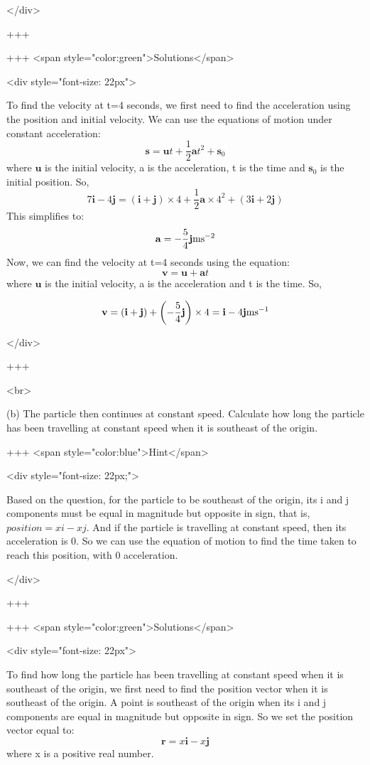 </div>

+++

+++ <span style="color:green">Solutions</span>

<div style="font-size: 22px">

To find the velocity at t=4 seconds, we first need to find the acceleration using the position and initial velocity. We can use the equations of motion under constant acceleration:
$$\mathbf{s}=\mathbf{u} t+\frac{1}{2} \mathbf{a} t^{2}+\mathbf{s}_{0}$$
where $\mathbf{u}$ is the initial velocity, a is the acceleration, t is the time and $\mathbf{s}_{0}$ is the initial position.
So,
\[7 \mathbf{i}-4 \mathbf{j}=(\mathbf{i}+\mathbf{j}) \times 4+\frac{1}{2} \mathbf{a} \times 4^{2}+(3 \mathbf{i}+2 \mathbf{j})\]
This simplifies to:
\[\mathbf{a}=-\frac{5}{4} \mathbf{j} \space \mathrm{ms}^{-2}\]
Now, we can find the velocity at t=4 seconds using the equation:
$$\mathbf{v}=\mathbf{u}+\mathbf{a} t$$
where $\mathbf{u}$ is the initial velocity, a is the acceleration and t is the time.
So,

\[\mathbf{v}=(\mathbf{i}+\mathbf{j})+\left(-\frac{5}{4} \mathbf{j}\right) \times 4=\mathbf{i}-4 \mathbf{j} \space \mathrm{ms}^{-1}\]

</div>

+++

<br>

(b) The particle then continues at constant speed.
Calculate how long the particle has been travelling at constant speed when it is southeast of the origin.

+++ <span style="color:blue">Hint</span>

<div style="font-size: 22px;">

Based on the question, for the particle to be southeast of the origin, its i and j components must be equal in magnitude but opposite in sign, that is, $position = xi - xj$. 
And if the particle is travelling at constant speed, then its acceleration is 0.
So we can use the equation of motion to find the time taken to reach this position, with 0 acceleration.

</div>

+++

+++ <span style="color:green">Solutions</span>

<div style="font-size: 22px">

To find how long the particle has been travelling at constant speed when it is southeast of the origin, we first need to find the position vector when it is southeast of the origin. A point is southeast of the origin when its i and j components are equal in magnitude but opposite in sign. So we set the position vector equal to:
\[\mathbf{r}=x \mathbf{i}-x \mathbf{j}\]
where x is a positive real number. 

